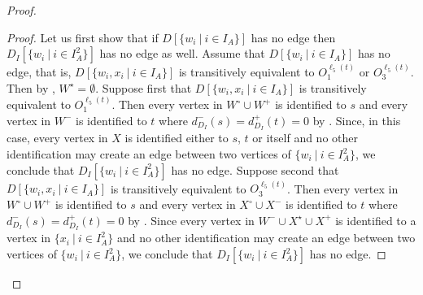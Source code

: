 \documentclass[a4paper,11pt]{article}
\theoremstyle{plain}
\newtheorem{identification rule}{Identification Rule}
\theoremstyle{definition}
\theoremstyle{remark}
\newenvironment{claimproof}{\begin{proof}\renewcommand{\qedsymbol}{\claimqed}}{\end{proof}\renewcommand{\qedsymbol}{\plainqed}}
\let\plainqed\qedsymbol
\newcommand{\claimqed}{$\lrcorner$}
\begin{document}
\begin{proof}
\begin{claimproof}
Let us first show that if $D[\{w_i~|~i \in I_A\}]$ has no edge then $D_I[\{w_i~|~i \in I_A^2\}]$ has no edge as well. 
Assume that $D[\{w_i~|~i \in I_A\}]$ has no edge, that is, $D[\{w_i,x_i~|~i \in I_A\}]$ is transitively equivalent to $O_1^{\ell_5(t)}$ or $O_3^{\ell_5(t)}$.
Then by , $W^\star = \emptyset$.
Suppose first that $D[\{w_i,x_i~|~i \in I_A\}]$ is transitively equivalent to $O_1^{\ell_5(t)}$. 
Then every vertex in $W^\circ \cup W^+$ is identified to $s$ and every vertex in $W^-$ is identified to $t$ 
where $d^-_{D_I}(s) = d^+_{D_I}(t) = 0$ by .
Since, in this case, every vertex in $X$ is identified either to $s$, $t$ or itself 
and no other identification may create an edge between two vertices of $\{w_i~|~i \in I_A^2\}$,
we conclude that $D_I[\{w_i~|~i \in I_A^2\}]$ has no edge.
Suppose second that $D[\{w_i,x_i~|~i \in I_A\}]$ is transitively equivalent to $O_3^{\ell_5(t)}$.
Then every vertex in $W^\circ \cup W^+$ is identified to $s$ and every vertex in $X^\circ \cup X^-$ is identified to $t$
where $d^-_{D_I}(s) = d^+_{D_I}(t) = 0$ by .
Since every vertex in $W^- \cup X^\star \cup X^+$ is identified to a vertex in $\{x_i~|~i \in I_A^2\}$ 
and no other identification may create an edge between two vertices of $\{w_i~|~i \in I_A^2\}$,
we conclude that $D_I[\{w_i~|~i \in I_A^2\}]$ has no edge.


\end{claimproof}
\end{proof}
\end{document}

